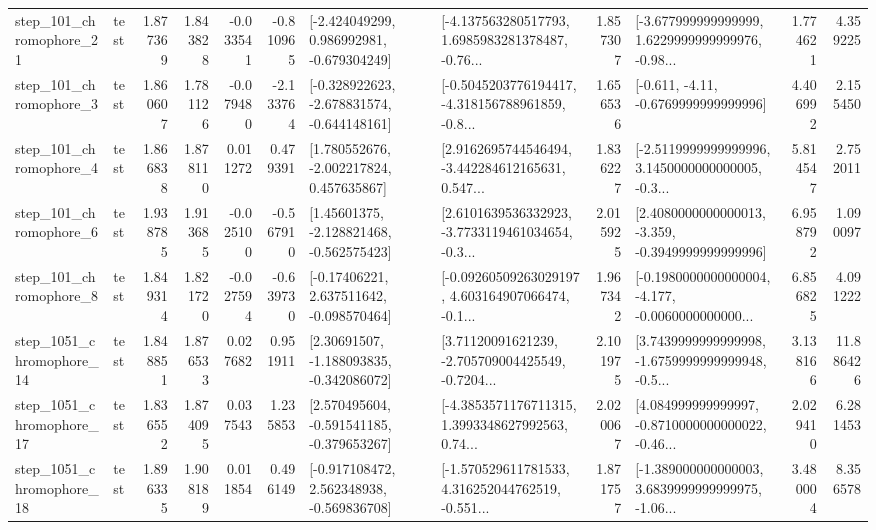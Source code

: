 \begin{tabular}{llrrrrllrlrr}
  step\_101\_chromophore\_21 &      test &      1.877369 &    1.843828 &     -0.033541 & -0.810965 &   [-2.424049299, 0.986992981, -0.679304249] &  [-4.137563280517793, 1.6985983281378487, -0.76... &       1.857307 &  [-3.677999999999999, 1.6229999999999976, -0.98... &            1.774621 &          4.359225 \\
   step\_101\_chromophore\_3 &      test &      1.860607 &    1.781126 &     -0.079480 & -2.133764 &  [-0.328922623, -2.678831574, -0.644148161] &  [-0.5045203776194417, -4.318156788961859, -0.8... &       1.656536 &               [-0.611, -4.11, -0.6769999999999996] &            4.406992 &          2.155450 \\
   step\_101\_chromophore\_4 &      test &      1.866838 &    1.878110 &      0.011272 &  0.479391 &    [1.780552676, -2.002217824, 0.457635867] &  [2.9162695744546494, -3.442284612165631, 0.547... &       1.836227 &  [-2.5119999999999996, 3.1450000000000005, -0.3... &            5.814547 &          2.752011 \\
   step\_101\_chromophore\_6 &      test &      1.938785 &    1.913685 &     -0.025100 & -0.567910 &    [1.45601375, -2.128821468, -0.562575423] &  [2.6101639536332923, -3.7733119461034654, -0.3... &       2.015925 &  [2.4080000000000013, -3.359, -0.3949999999999996] &            6.958792 &          1.090097 \\
   step\_101\_chromophore\_8 &      test &      1.849314 &    1.821720 &     -0.027594 & -0.639730 &    [-0.17406221, 2.637511642, -0.098570464] &  [-0.09260509263029197, 4.603164907066474, -0.1... &       1.967342 &  [-0.1980000000000004, -4.177, -0.0060000000000... &            6.856825 &          4.091222 \\
 step\_1051\_chromophore\_14 &      test &      1.848851 &    1.876533 &      0.027682 &  0.951911 &    [2.30691507, -1.188093835, -0.342086072] &  [3.71120091621239, -2.705709004425549, -0.7204... &       2.101975 &  [3.7439999999999998, -1.6759999999999948, -0.5... &            3.138166 &         11.886426 \\
 step\_1051\_chromophore\_17 &      test &      1.836552 &    1.874095 &      0.037543 &  1.235853 &   [2.570495604, -0.591541185, -0.379653267] &  [-4.3853571176711315, 1.3993348627992563, 0.74... &       2.020067 &  [4.084999999999997, -0.8710000000000022, -0.46... &            2.029410 &          6.281453 \\
 step\_1051\_chromophore\_18 &      test &      1.896335 &    1.908189 &      0.011854 &  0.496149 &   [-0.917108472, 2.562348938, -0.569836708] &  [-1.570529611781533, 4.316252044762519, -0.551... &       1.871757 &  [-1.389000000000003, 3.6839999999999975, -1.06... &            3.480004 &          8.356578 \\

\end{tabular}
